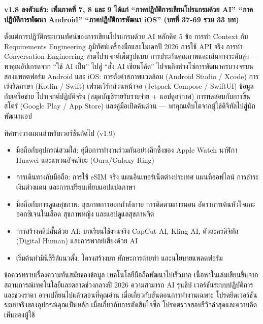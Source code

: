 

\textbf{v1.8 ลงตัวแล้ว: เพิ่มภาคที่ 7, 8 และ 9 ได้แก่ “ภาคปฏิบัติการเขียนโปรแกรมด้วย AI” “ภาคปฏิบัติการพัฒนา Android” “ภาคปฏิบัติการพัฒนา iOS” (บทที่ 37-69 รวม 33 บท)}\par

ตั้งแต่การปฏิวัติกระบวนทัศน์ของการเขียนโปรแกรมด้วย AI หลักคิด 5 ข้อ การทำ Context กับ Requirements Engineering ภูมิทัศน์เครื่องมือและโมเดลปี 2026 การใช้ API จริง การทำ Conversation Engineering สามโปรเจกต์เต็มรูปแบบ การประกันคุณภาพและเส้นทางระดับสูง — พาคุณอัปเกรดจาก “ใช้ AI เป็น” ไปสู่ “สั่ง AI เขียนโค้ด” ไปจนถึงห่วงโซ่การพัฒนาครบวงจรบนสองแพลตฟอร์ม Android และ iOS: การตั้งค่าสภาพแวดล้อม (Android Studio / Xcode) การเร่งรัดภาษา (Kotlin / Swift) เฟรมเวิร์กส่วนหน้าจอ (Jetpack Compose / SwiftUI) ข้อมูลกับเครือข่าย โปรเจกต์ปฏิบัติจริง (สมุดบัญชีรายรับรายจ่าย + แอปดูอากาศ) การทดสอบกับการขึ้นสโตร์ (Google Play / App Store) และคู่มือเปิดค้นด่วน — พาคุณเติบโตจากผู้ใช้ดิจิทัลไปสู่นักพัฒนาแอป

\begin{tcbinfo}{ทิศทางวางแผนสำหรับเวอร์ชันถัดไป (v1.9)}
\begin{itemize}
  \item มือถือกับอุปกรณ์สวมใส่: คู่มือการทำงานร่วมกันอย่างลึกซึ้งของ Apple Watch นาฬิกา Huawei และแหวนอัจฉริยะ (Oura/Galaxy Ring)
  \item การเดินทางกับมือถือ: การใช้ eSIM จริง แผนอินเทอร์เน็ตต่างประเทศ แผนที่ออฟไลน์ การชำระเงินต่างแดน และการเปรียบเทียบแอปแปลภาษา
  \item มือถือกับการดูแลสุขภาพ: สุขภาพการออกกำลังกาย การติดตามการนอน อัตราการเต้นหัวใจและออกซิเจนในเลือด สุขภาพหญิง และแอปดูแลสุขภาพจิต
  \item การสร้างคลิปสั้นด้วย AI: บทเรียนใช้งานจริง CapCut AI, Kling AI, ตัวละครดิจิทัล (Digital Human) และการพากย์เสียงด้วย AI
  \item เริ่มต้นทำมินิซีรีส์แนวตั้ง: โครงสร้างบท ทักษะการถ่ายทำ และนโยบายแพลตฟอร์ม
\end{itemize}

\end{tcbinfo}

\begin{tcbwarn}{ข้อควรทราบเรื่องความทันสมัยของข้อมูล}
เทคโนโลยีมือถือพัฒนาไปเร็วมาก เนื้อหาในเล่มเขียนขึ้นจากสถานการณ์เทคโนโลยีและตลาดช่วงกลางปี 2026 ความสามารถ AI รุ่นชิป เวอร์ชันระบบปฏิบัติการ และช่วงราคา อาจเปลี่ยนไปแล้วตอนที่คุณอ่าน เมื่อเกี่ยวกับขั้นตอนการทำงานเฉพาะ โปรดยึดเวอร์ชันระบบจริงของอุปกรณ์คุณเป็นหลัก เมื่อเกี่ยวกับการตัดสินใจซื้อ โปรดตรวจสอบรีวิวล่าสุดและความคิดเห็นของผู้ใช้

\end{tcbwarn}
